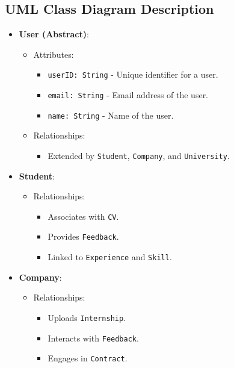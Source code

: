 \subsection*{UML Class Diagram Description}
\begin{itemize}
    \item \textbf{User (Abstract)}:
    \begin{itemize}
        \item Attributes:
        \begin{itemize}
            \item \texttt{userID: String} - Unique identifier for a user.
            \item \texttt{email: String} - Email address of the user.
            \item \texttt{name: String} - Name of the user.
        \end{itemize}
        \item Relationships:
        \begin{itemize}
            \item Extended by \texttt{Student}, \texttt{Company}, and \texttt{University}.
        \end{itemize}
    \end{itemize}

    \item \textbf{Student}:
    \begin{itemize}
        \item Relationships:
        \begin{itemize}
            \item Associates with \texttt{CV}.
            \item Provides \texttt{Feedback}.
            \item Linked to \texttt{Experience} and \texttt{Skill}.
        \end{itemize}
    \end{itemize}

    \item \textbf{Company}:
    \begin{itemize}
        \item Relationships:
        \begin{itemize}
            \item Uploads \texttt{Internship}.
            \item Interacts with \texttt{Feedback}.
            \item Engages in \texttt{Contract}.
        \end{itemize}
    \end{itemize}


\end{itemize}
